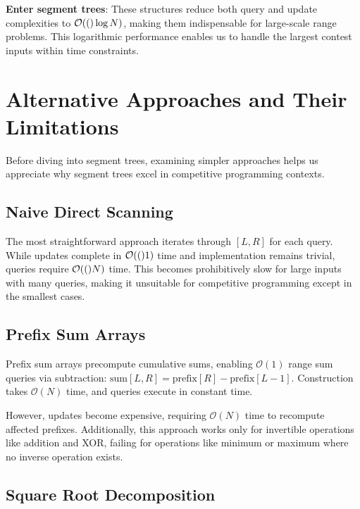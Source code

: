 \textbf{Enter segment trees}: These structures reduce both query and update complexities to $\mathcal{O}(()\log N)$, making them indispensable for large-scale range problems. This logarithmic performance enables us to handle the largest contest inputs within time constraints.

\section{Alternative Approaches and Their Limitations}
\label{sec:limitations_alternatives}

Before diving into segment trees, examining simpler approaches helps us appreciate why segment trees excel in competitive programming contexts.

\subsection{Naive Direct Scanning}

The most straightforward approach iterates through $[L,R]$ for each query. While updates complete in $\mathcal{O}(()1)$ time and implementation remains trivial, queries require $\mathcal{O}(()N)$ time. This becomes prohibitively slow for large inputs with many queries, making it unsuitable for competitive programming except in the smallest cases.

\subsection{Prefix Sum Arrays}


Prefix sum arrays precompute cumulative sums, enabling $\mathcal{O}(1)$ range sum queries via subtraction: $\text{sum}[L,R] = \text{prefix}[R] - \text{prefix}[L-1]$. Construction takes $\mathcal{O}(N)$ time, and queries execute in constant time.

However, updates become expensive, requiring $\mathcal{O}(N)$ time to recompute affected prefixes. Additionally, this approach works only for invertible operations like addition and XOR, failing for operations like minimum or maximum where no inverse operation exists.

\subsection{Square Root Decomposition}

